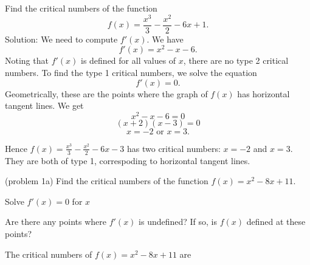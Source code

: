 \documentclass[handout]{ximera}
\begin{document}
\begin{example}[example 1] Find the critical numbers of the function 
\[f(x) = \dfrac{x^3}{3} - \dfrac{x^2}{2} - 6x +1.\]
Solution: We need to compute $f'(x)$.  We have
\[f'(x) = x^2 - x - 6.\]
Noting that $f'(x)$ is defined for all values of $x$, there are no type 2 critical numbers.
To find the type 1 critical numbers, we solve the equation
\[f'(x) = 0.\]
Geometrically, these are the points where the graph of $f(x)$ has horizontal tangent lines.
We get
\[ x^2 - x - 6 =0\]
\[ (x+2)(x-3) =0\]
\[x = -2 \mbox{  or  } x = 3.\]

Hence $f(x) = \frac{x^3}{3} - \frac{x^2}{2} - 6x - 3$ has two critical numbers: $x=-2$ and $x=3$. They are both of type 1,
correspoding to horizontal tangent lines.

\begin{image}
\end{image}

\end{example}



\begin{problem}(problem 1a)
  Find the critical numbers of the function $f(x) = x^2 - 8x + 11$.
		\begin{hint}
      Solve $f'(x) = 0$ for $x$
    \end{hint}
    \begin{hint}
      Are there any points where $f'(x)$ is undefined?
      If so, is $f(x)$ defined at these points?  
		\end{hint}
    
    
		The critical numbers of $f(x) = x^2 - 8x + 11$ are
		\begin{multipleChoice}
		\end{multipleChoice}
		
\end{problem}
\end{document}
